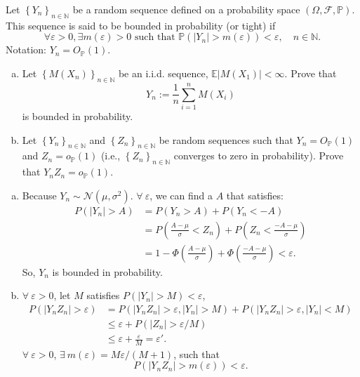 \begin{ex}
    Let \(\left\{Y_{n}\right\}_{n \in \mathbb{N}}\) be a random sequence defined on a probability space \((\Omega, \mathcal{F}, \mathbb{P})\). This sequence is said to be bounded in probability (or tight) if
    \[
        \forall \varepsilon>0, \exists m(\varepsilon)>0 \text { such that } \mathbb{P}\left(\left|Y_{n}\right|>m(\varepsilon)\right)<\varepsilon, \quad n \in \mathbb{N} .
    \]
    Notation: \(Y_{n}=O_{\mathbb{P}}(1)\). 
    \begin{enumerate}[(a)]
        \item Let \(\left\{M\left(X_{n}\right)\right\}_{n \in \mathbb{N}}\) be an i.i.d. sequence, \(\mathbb{E}\left|M\left(X_{1}\right)\right|<\infty\). Prove that
        \[
        Y_{n}:=\frac{1}{n} \sum_{i=1}^{n} M\left(X_{i}\right)
        \]
        is bounded in probability. 
        \item Let \(\left\{Y_{n}\right\}_{n \in \mathbb{N}}\) and \(\left\{Z_{n}\right\}_{n \in \mathbb{N}}\) be random sequences such that \(Y_{n}=O_{\mathbb{P}}(1)\) and \(Z_{n}=o_{\mathbb{P}}(1)\) (i.e., \(\left\{Z_{n}\right\}_{n \in \mathbb{N}}\) converges to zero in probability). Prove that \(Y_{n} Z_{n}=o_{\mathbb{P}}(1)\). 
    \end{enumerate}
\end{ex}

\begin{solution}
    \begin{enumerate}[(a)]
        \item Because $Y_n\sim \mathcal{N}(\mu, \sigma^2)$. $\forall\ \varepsilon$, we can find a $A$ that satisfies: 
        \[
            \begin{aligned}
                P(|Y_n|>A)&=P(Y_n>A)+P(Y_n<-A)\\
                &=P\left(\frac{A-\mu}{\sigma}<Z_n\right)+P\left(Z_n<\frac{-A-\mu}{\sigma}\right)\\
                &=1-\Phi\left(\frac{A-\mu}{\sigma}\right)+\Phi\left(\frac{-A-\mu}{\sigma}\right)<\varepsilon. 
            \end{aligned}
        \]
        So, $Y_n$ is bounded in probability. 
        \item $\forall\ \varepsilon>0$, let $M$ satisfies $P(|Y_n|>M)<\varepsilon$, 
        \begin{align*}
            P(|Y_nZ_n|>\varepsilon)&=P(|Y_nZ_n|>\varepsilon, |Y_n|>M)+P(|Y_nZ_n|>\varepsilon, |Y_n|<M)\\
            &\leqslant \varepsilon +P(|Z_n|>\varepsilon/M)\\
            &\leqslant \varepsilon+\frac{\varepsilon}{M}=\varepsilon'. 
        \end{align*}
        $\forall\ \varepsilon>0$, $\exists\ m(\varepsilon)=M\varepsilon/(M+1)$, such that 
        \[
            P(|Y_nZ_n|>m(\varepsilon))<\varepsilon. 
        \]
    \end{enumerate}
\end{solution}

